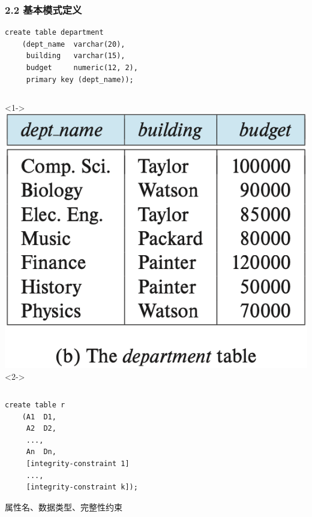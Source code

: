 \documentclass[aspectratio=169, 14pt]{beamer}
\begin{document}
\begin{frame}[fragile]
    \frametitle{2.2 基本模式定义}
    \begin{verbatim}
create table department
    (dept_name  varchar(20),
     building   varchar(15),
     budget     numeric(12, 2),
     primary key (dept_name)); 
    \end{verbatim}

    \begin{columns}
        <1->
        \includegraphics[width=\textwidth,trim={0cm 4cm 0cm 0cm},clip]{table/department}
        <2->
    \end{columns}
\end{frame}

\begin{frame}[fragile]
    \begin{verbatim}
create table r
    (A1  D1,
     A2  D2,
     ...,
     An  Dn,
     [integrity-constraint 1]
     ...,
     [integrity-constraint k]); 
    \end{verbatim}
    属性名、数据类型、完整性约束
\end{frame}
\end{document}
